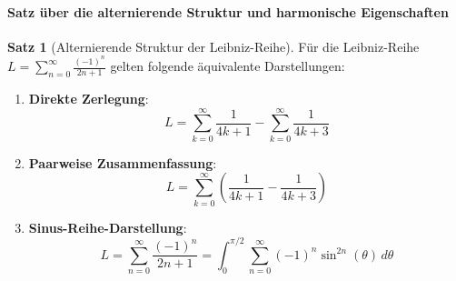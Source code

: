 \documentclass[a4paper,12pt,twoside]{report}
\theoremstyle{definition}
\newtheorem{satz}{Satz}
\begin{document}
\paragraph{Satz über die alternierende Struktur und harmonische Eigenschaften}

\begin{satz}[Alternierende Struktur der Leibniz-Reihe]
Für die Leibniz-Reihe $L = \sum_{n=0}^{\infty} \frac{(-1)^n}{2n+1}$ gelten folgende äquivalente Darstellungen:

\begin{enumerate}
\item \textbf{Direkte Zerlegung}: 
\begin{equation}
L = \sum_{k=0}^{\infty} \frac{1}{4k+1} - \sum_{k=0}^{\infty} \frac{1}{4k+3}
\end{equation}

\item \textbf{Paarweise Zusammenfassung}:
\begin{equation}
L = \sum_{k=0}^{\infty} \left( \frac{1}{4k+1} - \frac{1}{4k+3} \right)
\end{equation}

\item \textbf{Sinus-Reihe-Darstellung}:
\begin{equation}
L = \sum_{n=0}^{\infty} \frac{(-1)^n}{2n+1} = \int_0^{\pi/2} \sum_{n=0}^{\infty} (-1)^n \sin^{2n}(\theta) \, d\theta
\end{equation}
\end{enumerate}
\end{satz}
\end{document}
